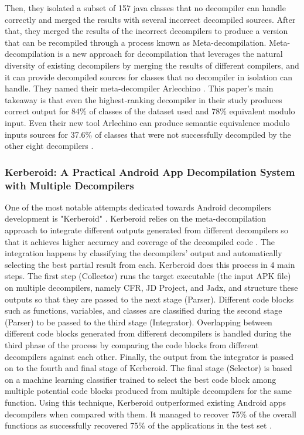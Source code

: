 \documentclass[conference,a4paper]{IEEEtran}
\begin{document}
Then, they isolated a subset of 157 java classes that no decompiler can handle correctly and merged the results with several incorrect decompiled sources.
After that, they merged the results of the incorrect decompilers to produce a version that can be recompiled through a process known as Meta-decompilation. Meta-decompilation is a new approach for decompilation that leverages the natural diversity of existing decompilers by merging the results of different compilers, and it can provide decompiled sources for classes that no decompiler in isolation can handle. They named their meta-decompiler Arlecchino \cite{harrand_java_2020}.
This paper’s main takeaway is that even the highest-ranking decompiler in their study produces correct output for 84\% of classes of the dataset used and 78\% equivalent modulo input. Even their new tool Arlechino can produce semantic equivalence modulo inputs sources for 37.6\% of classes that were not successfully decompiled by the other eight decompilers \cite{harrand_java_2020}.

\subsubsection{Kerberoid: A Practical Android App Decompilation System with Multiple Decompilers}
One of the most notable attempts dedicated towards Android decompilers development is "Kerberoid" \cite{jang_kerberoid_2019}. Kerberoid relies on the meta-decompilation approach to integrate different outputs generated from different decompilers so that it achieves higher accuracy and coverage of the decompiled code \cite{jang_kerberoid_2019}. The integration happens by classifying the decompilers' output and automatically selecting the best partial result from each. Kerberoid does this process in 4 main steps. The first step (Collector) runs the target executable (the input APK file) on multiple decompilers, namely CFR, JD Project, and Jadx, and structure these outputs so that they are passed to the next stage (Parser). Different code blocks such as functions, variables, and classes are classified during the second stage (Parser) to be passed to the third stage (Integrator). Overlapping between different code blocks generated from different decompilers is handled during the third phase of the process by comparing the code blocks from different decompilers against each other. Finally, the output from the integrator is passed on to the fourth and final stage of Kerberoid. The final stage (Selector) is based on a machine learning classifier trained to select the best code block among multiple potential code blocks produced from multiple decompilers for the same function.
Using this technique, Kerberoid outperformed existing Android apps decompilers when compared with them. It managed to recover 75\% of the overall functions as successfully recovered 75\% of the applications in the test set \cite{jang_kerberoid_2019}.
\end{document}
